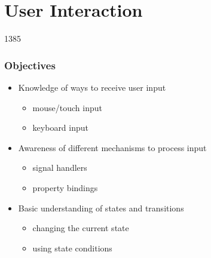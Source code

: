 %
%
%
%

\section{User Interaction}

\begin{slide}{1385}\frametitle{Objectives}

\begin{itemize}
\item Knowledge of ways to receive user input
  \begin{itemize}
  \item mouse/touch input
  \item keyboard input
  \end{itemize}
\item Awareness of different mechanisms to process input
  \begin{itemize}
  \item signal handlers
  \item property bindings
  \end{itemize}
\item Basic understanding of states and transitions
  \begin{itemize}
  \item changing the current state
  \item using state conditions
  \end{itemize}
\end{itemize}

\end{slide}    





